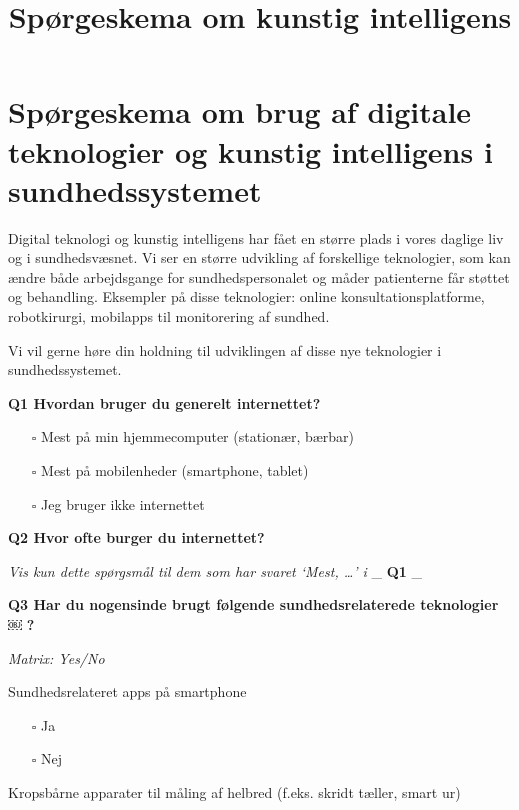 \documentclass[
]{article}
\title{Spørgeskema om kunstig intelligens}
\author{}
\date{\vspace{-2.5em}}
\providecommand{\tightlist}{%
  \setlength{\itemsep}{0pt}\setlength{\parskip}{0pt}}
\begin{document}
\maketitle

\hypertarget{spuxf8rgeskema-om-brug-af-digitale-teknologier-og-kunstig-intelligens-i-sundhedssystemet}{%
\section{Spørgeskema om brug af digitale teknologier og kunstig
intelligens i
sundhedssystemet}\label{spuxf8rgeskema-om-brug-af-digitale-teknologier-og-kunstig-intelligens-i-sundhedssystemet}}

Digital teknologi og kunstig intelligens har fået en større plads i
vores daglige liv og i sundhedsvæsnet. Vi ser en større udvikling af
forskellige teknologier, som kan ændre både arbejdsgange for
sundhedspersonalet og måder patienterne får støttet og behandling.
Eksempler på disse teknologier: online konsultationsplatforme,
robotkirurgi, mobilapps til monitorering af sundhed.

Vi vil gerne høre din holdning til udviklingen af disse nye teknologier
i sundhedssystemet.

\textbf{Q1 Hvordan bruger du generelt internettet?}

\begin{itemize}
\item[$\square$]
  Mest på min hjemmecomputer (stationær, bærbar)
\item[$\square$]
  Mest på mobilenheder (smartphone, tablet)
\item[$\square$]
  Jeg bruger ikke internettet
\end{itemize}

\textbf{Q2 Hvor ofte burger du internettet?}

\emph{Vis kun dette spørgsmål til dem som har svaret `Mest, \ldots{}' i}
\_ \textbf{Q1} \_

\textbf{Q3 Har du nogensinde brugt følgende sundhedsrelaterede
teknologier} ￼ \textbf{?}

\emph{Matrix: Yes/No}

Sundhedsrelateret apps på smartphone

\begin{itemize}
\tightlist
\item[$\square$]
  Ja
\item[$\square$]
  Nej
\end{itemize}

Kropsbårne apparater til måling af helbred (f.eks. skridt tæller, smart
ur)
\end{document}
